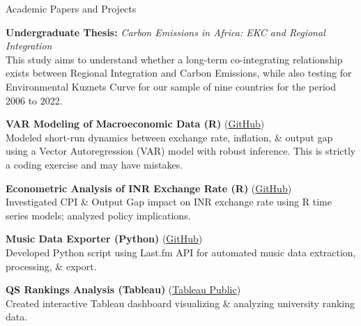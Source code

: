 \documentclass{resume} %
\begin{document}
	\begin{rSection}{Academic Papers and Projects}
		
		\textbf{Undergraduate Thesis:} \textit{Carbon Emissions in Africa: EKC and Regional Integration} \\
		This study aims to understand whether a long-term co-integrating relationship exists between Regional Integration and Carbon Emissions, while also testing for Environmental Kuznets Curve for our sample of nine countries for the period 2006 to 2022.
		
		\textbf{VAR Modeling of Macroeconomic Data (R)} (\href{https://github.com/HKay111/Macroeconomic-Analysis-R}{GitHub})\\
		Modeled short-run dynamics between exchange rate, inflation, \& output gap using a Vector Autoregression (VAR) model with robust inference. This is strictly a coding exercise and may have mistakes.
		
		\textbf{Econometric Analysis of INR Exchange Rate (R)} (\href{https://github.com/HKay111/IGD-Project}{GitHub})\\
		Investigated CPI \& Output Gap impact on INR exchange rate using R time series models; analyzed policy implications.
		
		\textbf{Music Data Exporter (Python)} (\href{https://github.com/HKay111}{GitHub})\\
		Developed Python script using Last.fm API for automated music data extraction, processing, \& export.
		
		\textbf{QS Rankings Analysis (Tableau)} (\href{https://public.tableau.com/app/profile/hridayam.kapila/vizzes}{Tableau Public})\\
		Created interactive Tableau dashboard visualizing \& analyzing university ranking data.
		
	\end{rSection}
	
	
\end{document}
